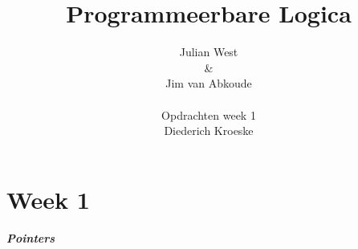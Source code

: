 \documentclass[10pt,a4paper]{report}
\author{Julian West \\ \& \\ Jim van Abkoude \\ ~~~~\\ Opdrachten week 1 \\ Diederich Kroeske}
\title{Programmeerbare Logica}
\begin{document}
\maketitle
\tableofcontents
\chapter{Week 1}
\paragraph{Pointers}
\end{document}
